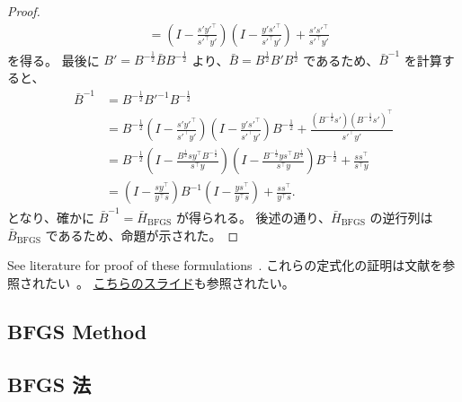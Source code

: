 \documentclass[0_main]{subfiles}
\begin{document}
\begin{proof}
\begin{align*}
                & = \left( I-\frac{s'y'^\top}{s'^\top y'} \right) \left( I-\frac{y's'^\top}{s'^\top y'} \right) +\frac{s's'^\top}{s'^\top y'}
    \end{align*}
    を得る。
    最後に $B' = B^{-\frac{1}{2}} \bar{B} B^{-\frac{1}{2}}$ より、$\bar{B} = B^{\frac{1}{2}} B' B^{\frac{1}{2}}$ であるため、$\bar{B}^{-1}$ を計算すると、
    \begin{align*}
        \bar{B}^{-1} & = B^{-\frac{1}{2}} B'^{-1} B^{-\frac{1}{2}}                                                                                                                                                                          \\
                     & = B^{-\frac{1}{2}} \left( I-\frac{s'y'^\top}{s'^\top y'} \right) \left( I-\frac{y's'^\top}{s'^\top y'} \right) B^{-\frac{1}{2}} + \frac{(B^{-\frac{1}{2}}s')(B^{-\frac{1}{2}}s')^\top}{s'^\top y'}                   \\
                     & = B^{-\frac{1}{2}} \left( I-\frac{B^{\frac{1}{2}}s y^\top B^{-\frac{1}{2}}}{s^\top y} \right) \left( I-\frac{B^{-\frac{1}{2}}y s^\top B^{\frac{1}{2}}}{s^\top y} \right) B^{-\frac{1}{2}} + \frac{ss^\top}{s^\top y} \\
                     & = \left( I - \frac{s y^\top}{y^\top s} \right) B^{-1} \left( I - \frac{y s^\top}{y^\top s} \right) + \frac{s s^\top}{y^\top s}.
    \end{align*}
    となり、確かに $\bar{B}^{-1} = \bar{H}_{\mathrm{BFGS}}$ が得られる。
    後述の通り、$\bar{H}_{\mathrm{BFGS}}$ の逆行列は $\bar{B}_{\mathrm{BFGS}}$ であるため、命題が示された。
    \myQED
\end{proof}

\ifEn
    See literature for proof of these formulations~\citep{kanamoriBregmanExtensionQuasiNewton2010,kanamoriBregmanExtensionQuasiNewton2010a}.
\else
    これらの定式化の証明は文献を参照されたい~\citep{kanamoriBregmanExtensionQuasiNewton2010,kanamoriBregmanExtensionQuasiNewton2010a}。
    \href{http://matsuzoe.web.nitech.ac.jp/infogeo/OCAMI2010/kanamori.pdf}{こちらのスライド}も参照されたい。
\fi


\ifEn
    \subsection{BFGS Method}
\else
    \subsection{BFGS 法}
\fi
\end{document}
